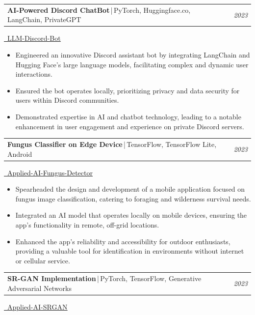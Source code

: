 \documentclass[10pt]{article}
\makeatletter
\newcommand{\projectheading}[3]{%
  \noindent\begin{tabularx}{\textwidth}{@{}X>{\raggedleft\arraybackslash}p{7em}@{}}
    \textbf{\large #1}\,|\,\normalfont #2 & \emph{#3}
  \end{tabularx}\par\nopagebreak
}
\makeatother
\begin{document}
\projectheading{AI-Powered Discord ChatBot}{PyTorch, Huggingface.co, LangChain, PrivateGPT}{2023}
\noindent\href{https://github.com/samxu29/LLM-Discord-Bot}{\raisebox{-0.2\height}\faGithub\ \underline{LLM-Discord-Bot}}
\begin{itemize}
        \item[{\color[RGB]{10,0,254}$\bullet$}] \noindent Engineered an innovative Discord assistant bot by integrating LangChain and Hugging Face's large language models, facilitating complex and dynamic user interactions.
        \item[{\color[RGB]{10,0,254}$\bullet$}] \noindent Ensured the bot operates locally, prioritizing privacy and data security for users within Discord communities.
        \item[{\color[RGB]{10,0,254}$\bullet$}] \noindent Demonstrated expertise in AI and chatbot technology, leading to a notable enhancement in user engagement and experience on private Discord servers.
	\end{itemize}
\projectheading{Fungus Classifier on Edge Device}{TensorFlow, TensorFlow Lite, Android}{2023}
\noindent\href{https://github.com/samxu29/Applied-AI-Fungus-Detector}{\raisebox{-0.2\height}\faGithub\ \underline{Applied-AI-Fungus-Detector}}
\begin{itemize}
        \item[{\color[RGB]{10,0,254}$\bullet$}] \noindent Spearheaded the design and development of a mobile application focused on fungus image classification, catering to foraging and wilderness survival needs.
        \item[{\color[RGB]{10,0,254}$\bullet$}] \noindent Integrated an AI model that operates locally on mobile devices, ensuring the app's functionality in remote, off-grid locations.
        \item[{\color[RGB]{10,0,254}$\bullet$}] \noindent Enhanced the app's reliability and accessibility for outdoor enthusiasts, providing a valuable tool for identification in environments without internet or cellular service.
	\end{itemize}
\projectheading{SR-GAN Implementation}{PyTorch, TensorFlow, Generative Adversarial Networks}{2023}
\noindent\href{https://github.com/samxu29/Applied-AI-SRGAN}{\raisebox{-0.2\height}\faGithub\ \underline{Applied-AI-SRGAN}}
\end{document}
